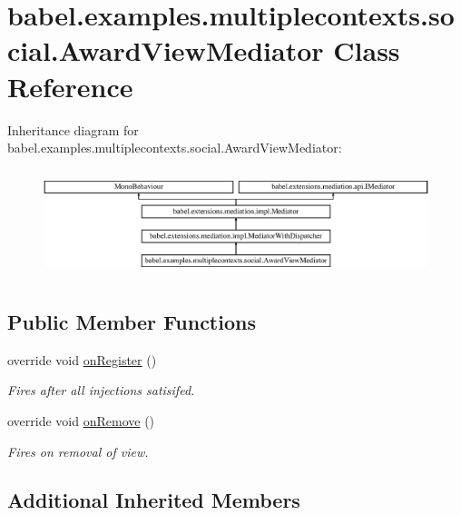 \hypertarget{classbabel_1_1examples_1_1multiplecontexts_1_1social_1_1_award_view_mediator}{\section{babel.\-examples.\-multiplecontexts.\-social.\-Award\-View\-Mediator Class Reference}
\label{classbabel_1_1examples_1_1multiplecontexts_1_1social_1_1_award_view_mediator}
}
Inheritance diagram for babel.\-examples.\-multiplecontexts.\-social.\-Award\-View\-Mediator\-:\begin{figure}[H]
\begin{center}
\leavevmode
\includegraphics[height=3.154930cm]{classbabel_1_1examples_1_1multiplecontexts_1_1social_1_1_award_view_mediator}
\end{center}
\end{figure}
\subsection*{Public Member Functions}
\begin{DoxyCompactItemize}
\item 
override void \hyperlink{classbabel_1_1examples_1_1multiplecontexts_1_1social_1_1_award_view_mediator_a28e5c49925670e32ccbd82c332b4b5fc}{on\-Register} ()
\begin{DoxyCompactList}\small\item\em Fires after all injections satisifed. \end{DoxyCompactList}\item 
override void \hyperlink{classbabel_1_1examples_1_1multiplecontexts_1_1social_1_1_award_view_mediator_a7571aa44095d692f2c08f589ec4b8bf4}{on\-Remove} ()
\begin{DoxyCompactList}\small\item\em Fires on removal of view. \end{DoxyCompactList}\end{DoxyCompactItemize}
\subsection*{Additional Inherited Members}


